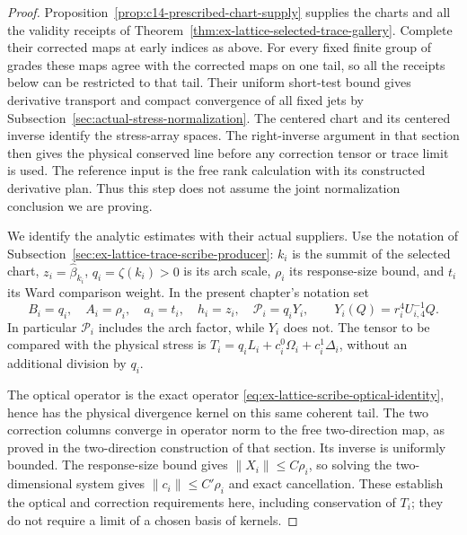\begin{proof}
Proposition~\ref{prop:c14-prescribed-chart-supply} supplies the charts
and all the validity receipts of
Theorem~\ref{thm:ex-lattice-selected-trace-gallery}. Complete their
corrected maps at early indices as above. For every fixed finite group
of grades these maps agree with the corrected maps on one tail, so
all the receipts below can be restricted to that tail. Their uniform
short-test bound gives derivative transport and compact convergence of
all fixed jets by Subsection~\ref{sec:actual-stress-normalization}.
The centered chart and its centered inverse identify the stress-array
spaces. The right-inverse argument in that section then gives the
physical conserved line before any correction tensor or trace limit is
used. The reference input is the free rank calculation with its
constructed derivative plan. Thus this step does not assume the joint
normalization conclusion we are proving.

We identify the analytic estimates with their actual suppliers. Use the
notation of Subsection~\ref{sec:ex-lattice-trace-scribe-producer}:
$k_i$ is the summit of the selected chart, $z_i=\widehat\beta_{k_i}$,
$q_i=\zeta(k_i)>0$ is its arch scale, $\rho_i$ its response-size bound,
and $t_i$ its Ward comparison weight. In the present chapter's notation set
\[
 B_i=q_i,\quad A_i=\rho_i,\quad a_i=t_i,\quad h_i=z_i,
 \quad\mathcal P_i=q_iY_i,
 \qquad Y_i(Q)=r_i^4U_{i,4}^{-1}Q.
\]
In particular $\mathcal P_i$ includes the arch factor, while $Y_i$
does not. The tensor to be compared with the physical stress is
$T_i=q_iL_i+c_i^0\Omega_i+c_i^1\Delta_i$, without an additional division
by $q_i$.

The optical operator is the exact operator
\eqref{eq:ex-lattice-scribe-optical-identity}, hence has the physical
divergence kernel on this same coherent tail. The two correction
columns converge in operator norm to the free two-direction map, as
proved in the two-direction construction of that section. Its inverse
is uniformly bounded. The response-size bound gives
$\|X_i\|\le C\rho_i$, so solving the two-dimensional system gives
$\|c_i\|\le C'\rho_i$ and exact cancellation. These establish the
optical and correction requirements here, including conservation of
$T_i$; they do not require a limit of a chosen basis of kernels.


\end{proof}
